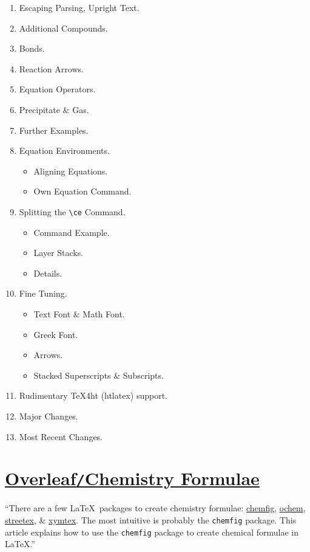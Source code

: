\documentclass{article}
\begin{document}
\begin{enumerate}
	\item {\sf Escaping Parsing, Upright Text.}
	\item {\sf Additional Compounds.}
	\item {\sf Bonds.}
	\item {\sf Reaction Arrows.}
	\item {\sf Equation Operators.}
	\item {\sf Precipitate \& Gas.}
	\item {\sf Further Examples.}
	\item {\sf Equation Environments.}
	\begin{itemize}
		\item {\sf Aligning Equations.}
		\item {\sf Own Equation Command.}
	\end{itemize}
	\item {\sf Splitting the \verb|\ce| Command.}
	\begin{itemize}
		\item {\sf Command Example.}
		\item {\sf Layer Stacks.}
		\item {\sf Details.}
	\end{itemize}
	\item {\sf Fine Tuning.}
	\begin{itemize}
		\item {\sf Text Font \& Math Font.}
		\item {\sf Greek Font.}
		\item {\sf Arrows.}
		\item {\sf Stacked Superscripts \& Subscripts.}
	\end{itemize}
	\item {\sf Rudimentary \TeX4ht (htlatex) support.}
	\item {\sf Major Changes.}
	\item {\sf Most Recent Changes.}
\end{enumerate}


\section{\href{https://www.overleaf.com/learn/latex/Chemistry_formulae}{Overleaf{\tt /}Chemistry Formulae}}
``There are a few \LaTeX\ packages to create chemistry formulae: \href{http://www.ctan.org/pkg/chemfig}{chemfig}, \href{http://www.ctan.org/pkg/ochem}{ochem}, \href{http://ctan.org/pkg/streetex}{streetex}, \& \href{http://www.ctan.org/pkg/xymtex}{xymtex}. The most intuitive is probably the {\tt chemfig} package. This article explains how to use the {\tt chemfig} package to create chemical formulae in \LaTeX.''
\end{document}
